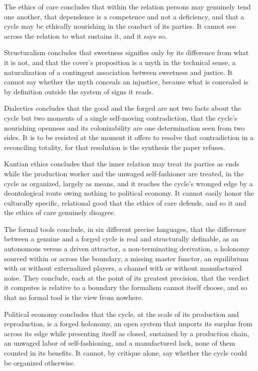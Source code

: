 The ethics of care concludes that within the relation persons may genuinely tend one another, that dependence is a competence and not a deficiency, and that a cycle may be ethically nourishing in the conduct of its parties. It cannot see across the relation to what sustains it, and it says so.

Structuralism concludes that sweetness signifies only by its difference from what it is not, and that the cover's proposition is a myth in the technical sense, a naturalization of a contingent association between sweetness and justice. It cannot say whether the myth conceals an injustice, because what is concealed is by definition outside the system of signs it reads.

Dialectics concludes that the good and the forged are not two facts about the cycle but two moments of a single self-moving contradiction, that the cycle's nourishing openness and its colonizability are one determination seen from two sides. It is to be resisted at the moment it offers to resolve that contradiction in a reconciling totality, for that resolution is the synthesis the paper refuses.

Kantian ethics concludes that the inner relation may treat its parties as ends while the production worker and the unwaged self-fashioner are treated, in the cycle as organized, largely as means, and it reaches the cycle's wronged edge by a deontological route owing nothing to political economy. It cannot easily honor the culturally specific, relational good that the ethics of care defends, and so it and the ethics of care genuinely disagree.

The formal tools conclude, in six different precise languages, that the difference between a genuine and a forged cycle is real and structurally definable, as an autonomous versus a driven attractor, a non-terminating derivation, a holonomy sourced within or across the boundary, a missing master functor, an equilibrium with or without externalized players, a channel with or without manufactured noise. They conclude, each at the point of its greatest precision, that the verdict it computes is relative to a boundary the formalism cannot itself choose, and so that no formal tool is the view from nowhere.

Political economy concludes that the cycle, at the scale of its production and reproduction, is a forged holonomy, an open system that imports its surplus from across its edge while presenting itself as closed, sustained by a production chain, an unwaged labor of self-fashioning, and a manufactured lack, none of them counted in its benefits. It cannot, by critique alone, say whether the cycle could be organized otherwise.


